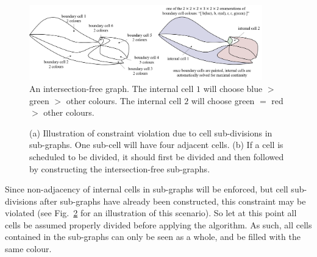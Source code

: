 \documentclass[journal]{IEEEtran}
\begin{document}
\begin{figure}[t]
\centering
\includegraphics[width=0.9\textwidth]{figures/characteristic_string_3}
\caption{An intersection-free graph. 
The internal cell $1$ will choose blue $>$ green $>$ other colours. 
The internal cell $2$ will choose green $=$ red $>$ other colours.
}\label{fig:characteristic_string}
\end{figure}

\begin{figure}[t]
\centering
{}
\caption{(a) Illustration of constraint violation due to cell sub-divisions in sub-graphs. One sub-cell will have four adjacent cells. (b) If a cell is scheduled to be divided, it should first be divided and then followed by constructing the intersection-free sub-graphs.}
\label{fig:constraint_violation}
\end{figure}



Since non-adjacency of internal cells in sub-graphs will be enforced, but cell sub-divisions after sub-graphs have already been constructed, this constraint may be violated (see Fig.~\ref{fig:constraint_violation} for an illustration of this scenario).
So let at this point all cells be assumed properly divided before applying the algorithm. As such, 
all cells contained in the sub-graphs can only be seen as a whole, and be filled with the same colour. 
\end{document}
